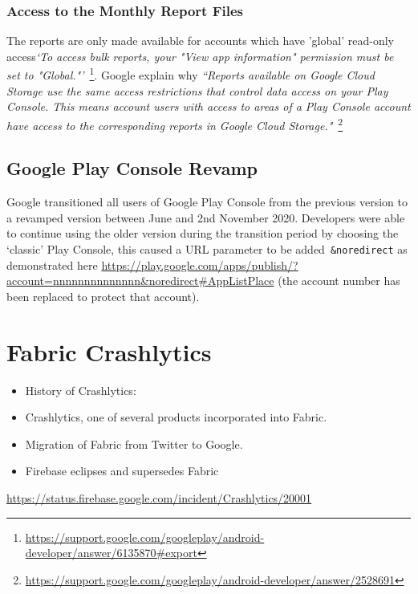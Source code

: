 
\subsubsection{Access to the Monthly Report Files}
The reports are only made available for accounts which have 'global' read-only access\emph{`To access bulk reports, your "View app information" permission must be set to "Global."'}~\footnote{\url{https://support.google.com/googleplay/android-developer/answer/6135870\#export}}. Google explain why \emph{``Reports available on Google Cloud Storage use the same access restrictions that control data access on your Play Console. This means account users with access to areas of a Play Console account have access to the corresponding reports in Google Cloud Storage."}~\footnote{\url{https://support.google.com/googleplay/android-developer/answer/2528691}}  

\subsection{Google Play Console Revamp}
Google transitioned all users of Google Play Console from the previous version to a revamped version between June and 2nd November 2020. Developers were able to continue using the older version during the transition period by choosing the `classic' Play Console, this caused a URL parameter to be added~\texttt{\&noredirect} as demonstrated here
\url{https://play.google.com/apps/publish/?account=nnnnnnnnnnnnnn\&noredirect#AppListPlace} (the account number has been replaced to protect that account).

\section{Fabric Crashlytics}

\begin{itemize}
    \item History of Crashlytics:
    \item Crashlytics, one of several products incorporated into Fabric.
    \item Migration of Fabric from Twitter to Google.
    \item Firebase eclipses and supersedes Fabric
\end{itemize}

\url{https://status.firebase.google.com/incident/Crashlytics/20001}

